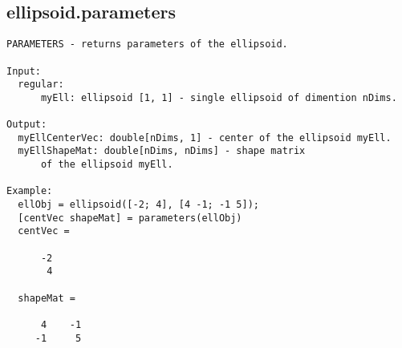 \subsection{\texorpdfstring{ellipsoid.parameters}{parameters}}\label{method:ellipsoid.parameters}
\begin{verbatim}
PARAMETERS - returns parameters of the ellipsoid.

Input:
  regular:
      myEll: ellipsoid [1, 1] - single ellipsoid of dimention nDims.

Output:
  myEllCenterVec: double[nDims, 1] - center of the ellipsoid myEll.
  myEllShapeMat: double[nDims, nDims] - shape matrix
      of the ellipsoid myEll.

Example:
  ellObj = ellipsoid([-2; 4], [4 -1; -1 5]);
  [centVec shapeMat] = parameters(ellObj)
  centVec =

      -2
       4

  shapeMat =

      4    -1
     -1     5
\end{verbatim}
